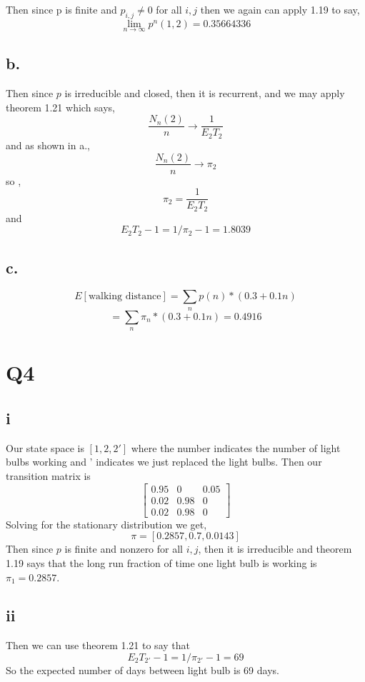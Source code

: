 \documentclass{article}
\begin{document}
Then since p is finite and $p_{i,j} \neq 0$ for all $i,j$ then we again can apply 1.19 to say,  
\[
\lim_{n \to \infty} p^n(1,2) = 0.35664336
\]
\subsection*{b.}
Then since $p$ is irreducible and closed, then it is recurrent, and we may apply theorem 1.21 which says,
\[
\frac{N_n(2)}{n} \rightarrow \frac{1}{E_2T_2}
\]
and as shown in a.,
\[
\frac{N_n(2)}{n} \rightarrow \pi_2
\]
so ,
\[
\pi_2 = \frac{1}{E_2T_2}
\]
and
\[
E_2T_2 -1 = 1/\pi_2 -1 = 1.8039
\]
\subsection*{c.}
\[
E[\text{walking distance}] = \sum_{n} p(n) * (0.3 + 0.1n)
\]
\[
= \sum_{n} \pi_n * (0.3 + 0.1n) = 0.4916
\]

\section*{Q4}
\subsection*{i}
Our state space is $[1,2,2']$ where the number indicates the number of light bulbs working and ' indicates we just replaced  the light bulbs.
Then our transition matrix is
\[
\begin{bmatrix}
0.95 & 0 & 0.05\\
0.02 & 0.98 & 0\\
0.02 & 0.98 & 0 
\end{bmatrix}
\]
Solving for the stationary distribution we get,
\[
\pi = [ 0.2857,  0.7       ,  0.0143]
\]
Then since $p$ is finite and nonzero for all $i,j$, then it is irreducible and theorem 1.19 says that the long run fraction of time one light bulb is working is $\pi_1 = 0.2857$. 

\subsection*{ii}
Then we can use theorem 1.21 to say that
\[
E_2T_{2'} - 1 = 1/\pi_{2'} -1 = 69
\]
So the expected number of days between light bulb is 69 days.
\end{document}
